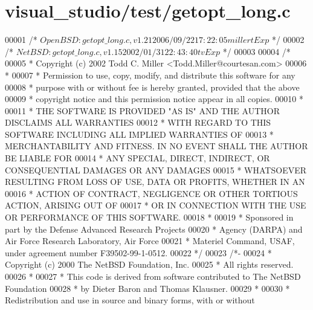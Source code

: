 \hypertarget{visual__studio_2test_2getopt__long_8c_source}{}\section{visual\+\_\+studio/test/getopt\+\_\+long.c}
\label{visual__studio_2test_2getopt__long_8c_source}

\begin{DoxyCode}
00001 \textcolor{comment}{/*  $OpenBSD: getopt\_long.c,v 1.21 2006/09/22 17:22:05 millert Exp $    */}
00002 \textcolor{comment}{/*  $NetBSD: getopt\_long.c,v 1.15 2002/01/31 22:43:40 tv Exp $  */}
00003 
00004 \textcolor{comment}{/*}
00005 \textcolor{comment}{ * Copyright (c) 2002 Todd C. Miller <Todd.Miller@courtesan.com>}
00006 \textcolor{comment}{ *}
00007 \textcolor{comment}{ * Permission to use, copy, modify, and distribute this software for any}
00008 \textcolor{comment}{ * purpose with or without fee is hereby granted, provided that the above}
00009 \textcolor{comment}{ * copyright notice and this permission notice appear in all copies.}
00010 \textcolor{comment}{ *}
00011 \textcolor{comment}{ * THE SOFTWARE IS PROVIDED "AS IS" AND THE AUTHOR DISCLAIMS ALL WARRANTIES}
00012 \textcolor{comment}{ * WITH REGARD TO THIS SOFTWARE INCLUDING ALL IMPLIED WARRANTIES OF}
00013 \textcolor{comment}{ * MERCHANTABILITY AND FITNESS. IN NO EVENT SHALL THE AUTHOR BE LIABLE FOR}
00014 \textcolor{comment}{ * ANY SPECIAL, DIRECT, INDIRECT, OR CONSEQUENTIAL DAMAGES OR ANY DAMAGES}
00015 \textcolor{comment}{ * WHATSOEVER RESULTING FROM LOSS OF USE, DATA OR PROFITS, WHETHER IN AN}
00016 \textcolor{comment}{ * ACTION OF CONTRACT, NEGLIGENCE OR OTHER TORTIOUS ACTION, ARISING OUT OF}
00017 \textcolor{comment}{ * OR IN CONNECTION WITH THE USE OR PERFORMANCE OF THIS SOFTWARE.}
00018 \textcolor{comment}{ *}
00019 \textcolor{comment}{ * Sponsored in part by the Defense Advanced Research Projects}
00020 \textcolor{comment}{ * Agency (DARPA) and Air Force Research Laboratory, Air Force}
00021 \textcolor{comment}{ * Materiel Command, USAF, under agreement number F39502-99-1-0512.}
00022 \textcolor{comment}{ */}
00023 \textcolor{comment}{/*-}
00024 \textcolor{comment}{ * Copyright (c) 2000 The NetBSD Foundation, Inc.}
00025 \textcolor{comment}{ * All rights reserved.}
00026 \textcolor{comment}{ *}
00027 \textcolor{comment}{ * This code is derived from software contributed to The NetBSD Foundation}
00028 \textcolor{comment}{ * by Dieter Baron and Thomas Klausner.}
00029 \textcolor{comment}{ *}
00030 \textcolor{comment}{ * Redistribution and use in source and binary forms, with or without}

\end{DoxyCode}
